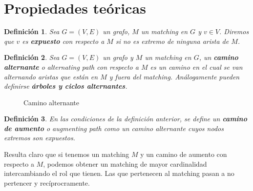 \documentclass[twoside,a4paper,openright,12pt,tikz]{book}
\newtheorem{defi}{Definici\'on}[section]
\begin{document}
\section{Propiedades teóricas}
\begin{defi}
Sea $G=(V,E)$ un grafo, $M$ un matching en $G$ y $v\in V$. Diremos que $v$ es \textbf{expuesto} con respecto a $M$ si no es extremo de ninguna arista de $M$.
\end{defi}
\begin{defi}
Sea $G=(V,E)$ un grafo y $M$ un matching en $G$, un \textbf{camino alternante} o \textit{alternating path} con respecto a $M$ es un camino en el cual se van alternando aristas que están en $M$ y fuera del matching. Análogamente pueden definirse \textbf{árboles y ciclos alternantes}.
\end{defi}
\begin{figure}[h!]
\centering
{}
\caption{Camino alternante}
\end{figure}

\begin{defi}
En las condiciones de la definición anterior, se define un \textbf{camino de aumento} o \textit{augmenting path} como un camino alternante cuyos nodos extremos son expuestos.
\end{defi}
Resulta claro que si tenemos un matching $M$ y un camino de aumento con respecto a $M$, podemos obtener un matching de mayor cardinalidad intercambiando el rol que tienen. Las que pertenecen al matching pasan a no pertencer y recíprocramente.
\end{document}
